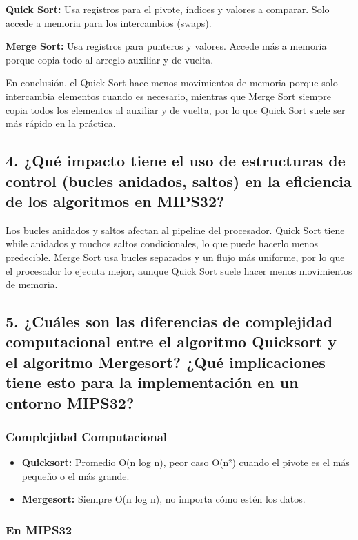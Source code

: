 \documentclass[12pt]{article}
\begin{document}
\textbf{Quick Sort:} Usa registros para el pivote, índices y valores a comparar. Solo accede a memoria para los intercambios (swaps).

\textbf{Merge Sort:} Usa registros para punteros y valores. Accede más a memoria porque copia todo al arreglo auxiliar y de vuelta.

En conclusión, el Quick Sort hace menos movimientos de memoria porque solo intercambia elementos cuando es necesario, mientras que Merge Sort siempre copia todos los elementos al auxiliar y de vuelta, por lo que Quick Sort suele ser más rápido en la práctica.

\subsection*{4. ¿Qué impacto tiene el uso de estructuras de control (bucles anidados, saltos) en la eficiencia de los algoritmos en MIPS32?}

Los bucles anidados y saltos afectan al pipeline del procesador. Quick Sort tiene while anidados y muchos saltos condicionales, lo que puede hacerlo menos predecible. Merge Sort usa bucles separados y un flujo más uniforme, por lo que el procesador lo ejecuta mejor, aunque Quick Sort suele hacer menos movimientos de memoria.

\subsection*{5. ¿Cuáles son las diferencias de complejidad computacional entre el algoritmo Quicksort y el algoritmo Mergesort? ¿Qué implicaciones tiene esto para la implementación en un entorno MIPS32?}

\subsubsection*{Complejidad Computacional}

\begin{itemize}
    \item \textbf{Quicksort:} Promedio O(n log n), peor caso O(n²) cuando el pivote es el más pequeño o el más grande.
    \item \textbf{Mergesort:} Siempre O(n log n), no importa cómo estén los datos.
\end{itemize}

\subsubsection*{En MIPS32}
\end{document}
